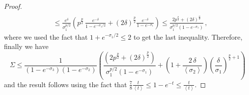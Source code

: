 \documentclass[10pt,a4paper]{amsart}
\newcommand		{\bangle}[1]	{\lt\langle #1\rt\rangle}
\newcommand		{\lt}			{\left}				%
\newcommand		{\rt}			{\right}			%
\newcommand		{\weight}[1]	{\bangle{#1}}	%
\begin{document}
\begin{proof}
\begin{align*}
			\\
			&\leq \frac{e^\delta}{\sigma_1^{p/2}}\lt( p^\frac{p}{2}\,  \frac{e^{- \delta}}{1- e^{-\sigma_1/2}} + \lt(2\delta\rt)^\frac{p}{2} \frac{e^{- \delta}}{1- e^{-\sigma_1}} \rt) \leq \frac{2 p^\frac{p}{2} + \lt(2\delta\rt)^\frac{p}{2}}{\sigma_1^{p/2}\lt(1- e^{-\sigma_1}\rt)}\,,
		\end{align*}
		where we used the fact that $1 + e^{-\sigma_1/2} \leq 2$ to get the last inequality. Therefore, finally we have
		\begin{equation*}
			\Sigma \leq \frac{1}{\lt(1-e^{-\sigma_3}\rt)\lt(1-e^{-\sigma_2}\rt)}
			\lt(\frac{\lt( 2 p^\frac{p}{2} + \lt(2\delta\rt)^\frac{p}{2} \rt)}{\sigma_1^{p/2}\lt(1- e^{-\sigma_1}\rt)} 
			+  \lt(1+\frac{2\,\delta}{\weight{\sigma_2}}\rt) \lt(\frac{\delta}{\sigma_1}\rt)^{\frac{p}{2}+1} \rt)
		\end{equation*}
		and the result follows using the fact that $\frac{7}{8} \frac{t}{\weight{t}} \leq 1-e^{-t} \leq \frac{t}{\weight{t}}$.
	\end{proof}
\end{document}
